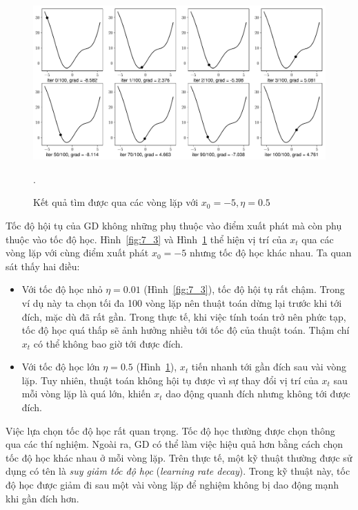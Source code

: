 \begin{figure}[t]
\centering
\includegraphics[width =
.975\textwidth]{ebookML_src/src/grad_descent/gd1d_2.pdf}
\caption[]{Kết quả tìm được qua các vòng lặp với $x_0 = -5, \eta = 0.5$}.
\label{fig:7_4}
\end{figure}



Tốc độ hội tụ của GD không những phụ thuộc vào điểm xuất phát mà còn phụ
thuộc vào tốc độ học. Hình~\ref{fig:7_3} và Hình~\ref{fig:7_4} thể
hiện vị trí của $x_t$ qua các vòng lặp với cùng điểm xuất phát $x_{0} = -5$
nhưng tốc độ học khác nhau. Ta quan sát thấy hai điều:
\begin{itemize}
\item Với tốc độ học nhỏ $\eta = 0.01$ (Hình~\ref{fig:7_3}), tốc độ
hội tụ rất chậm. Trong ví dụ này ta chọn tối đa 100 vòng lặp nên thuật toán
dừng lại trước khi tới {đích}, mặc dù đã rất gần. Trong thực tế, khi việc
tính toán trở nên phức tạp, tốc độ học quá thấp sẽ ảnh hưởng nhiều tới tốc
độ của thuật toán. Thậm chí $x_t$ có thể không bao giờ tới được đích.

\item Với tốc độ học lớn $\eta = 0.5$ (Hình~\ref{fig:7_4}),
$x_t$ tiến nhanh tới {gần đích} sau vài vòng lặp. Tuy nhiên,
thuật toán không hội tụ được vì sự thay đổi vị trí của $x_t$ sau mỗi vòng
lặp là quá lớn, khiến $x_t$ dao động quanh đích nhưng không tới được đích.

\end{itemize}
Việc lựa chọn tốc độ học rất quan trọng. Tốc độ học thường được chọn thông qua
các thí nghiệm. Ngoài ra, GD có thể làm việc hiệu quả hơn bằng cách chọn tốc độ
học khác nhau ở mỗi vòng lặp. Trên thực tế, một kỹ thuật thường được sử dụng có
tên là \textit{suy giảm tốc độ học} (\textit{learning rate decay}). Trong kỹ
thuật này, tốc độ học được giảm đi sau một vài vòng lặp để nghiệm không bị dao
động mạnh khi gần đích hơn.


